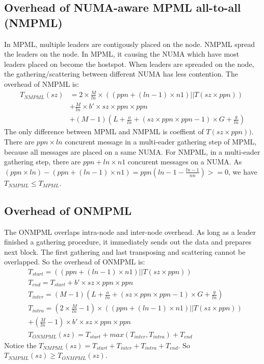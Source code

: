 \subsection {Overhead of NUMA-aware MPML all-to-all (NMPML) }
In MPML, multiple leaders are contigously placed on the node. NMPML spread the leaders on the node.
In MPML, it causing the NUMA which have most leaders placed on become the hostspot.
When leaders are spreaded on the node, the gathering/scattering between different NUMA has less contention.
The overhead of NMPML is:
\begin{equation}
\begin{split}
T_{NMPML}(sz) & = 2 \times \frac{M}{ln} \times ((ppn + (ln - 1) \times n1)||T(sz\times ppn)) \\
			  & + \frac{M}{ln} \times b'\times sz\times ppn\times ppn \\
			  & + (M-1)  (L + \frac{o}{ln} +(sz\times ppn\times ppn - 1) \times G + \frac{g}{ln})
\end{split}
\label{NMPML-overhead}
\end{equation}
The only difference between MPML and NMPML is coeffient of $T(sz\times ppn))$.
There are $ppn \times ln$ concurent message in a multi-eader gathering step of MPML, because all messages are placed on a same NUMA.
For NMPML, in a multi-eader gathering step, there are $ppn + ln \times n1$ concurent messages on a NUMA.
As $(ppn \times ln) - (ppn + (ln - 1)  \times n1) = ppn(ln - 1 - \frac{ln-1}{nn}) >= 0$, we have $T_{NMPML} \le T_{MPML}$.


\subsection {Overhead of ONMPML}
The ONMPML overlaps intra-node and inter-node overhead. 
As long as a leader finished a gathering procedure, it immediately sends out the data and prepares next block.
The first gathering and last transposing and scattering cannot be overlapped.
So the overhead of ONMPML is:
\begin{align*}
  & T_{start} = ((ppn + (ln - 1) \times n1)||T(sz\times ppn)) \\
  & T_{end}   = T_{start} + b'\times sz\times ppn\times ppn \\
  & T_{inter} =  (M-1)  (L + \frac{o}{ln} +(sz\times ppn\times ppn - 1) \times G + \frac{g}{ln}) \\
  & T_{intra} =   (2 \times \frac{M}{ln} - 1) \times ((ppn + (ln - 1) \times n1)||T(sz\times ppn)) \\
  &	+(\frac{M}{ln} - 1) \times b'\times sz\times ppn\times ppn \\
  & T_{ONMPML}(sz) = T_{start} + max(T_{inter},T_{intra}) + T_{end}
\end{align*}
\label{ONMPML-overhead}
Notice  the $T_{NMPML}(sz) =  T_{start} + T_{inter} + T_{intra} + T_{end}$. 
So $T_{NMPML}(sz) \ge T_{ONMPML}(sz) $.